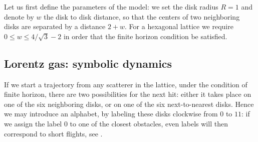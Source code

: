 {Let us first define the parameters of the model: we set the disk radius
$R=1$
and denote by $w$ the disk to disk distance, so that the centers of two
neighboring disks are separated by a distance $2+w$. For a hexagonal
lattice we require $0\leq w \leq 4/\sqrt{3}-2$ in order that
the finite horizon condition be satisfied.

\subsection{Lorentz gas: symbolic dynamics}

If we start a trajectory from any scatterer in the lattice,
under the condition of finite horizon, there are two
possibilities for the next hit: either it takes place on one of the six
neighboring disks, or on one of the six
next-to-nearest disks. Hence we may introduce an alphabet, by labeling
these disks clockwise from $0$ to $11$: if we assign the label $0$ to one
of the closest obstacles, even labels will then correspond to short flights,
see .

}
